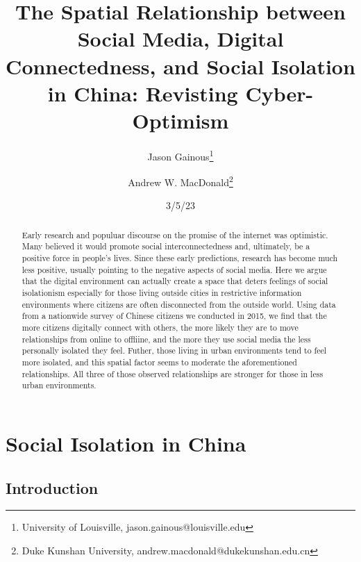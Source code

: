 \documentclass[
  letterpaper,
  DIV=11,
  numbers=noendperiod]{scrartcl}
\title{The Spatial Relationship between Social Media, Digital
Connectedness, and Social Isolation in China: Revisting Cyber-Optimism}
\author{Jason Gainous\footnote{University of Louisville,
  jason.gainous@louisville.edu} \and Andrew W. MacDonald\footnote{Duke
  Kunshan University, andrew.macdonald@dukekunshan.edu.cn}}
\date{3/5/23}
\begin{document}
\maketitle
\begin{abstract}
Early research and populuar discourse on the promise of the internet was
optimistic. Many believed it would promote social interconnectedness
and, ultimately, be a positive force in people's lives. Since these
early predictions, research has become much less positive, usually
pointing to the negative aspects of social media. Here we argue that the
digital environment can actually create a space that deters feelings of
social isolationism especially for those living outside cities in
restrictive information environments where citizens are often
disconnected from the outside world. Using data from a nationwide survey
of Chinese citizens we conducted in 2015, we find that the more citizens
digitally connect with others, the more likely they are to move
relationships from online to offliine, and the more they use social
media the less personally isolated they feel. Futher, those living in
urban environments tend to feel more isolated, and this spatial factor
seems to moderate the aforementioned relationships. All three of those
observed relationships are stronger for those in less urban
environments.
\end{abstract}
\ifdefined\Shaded\renewenvironment{Shaded}{\begin{tcolorbox}[breakable, enhanced, frame hidden, interior hidden, boxrule=0pt, sharp corners, borderline west={3pt}{0pt}{shadecolor}]}{\end{tcolorbox}}\fi

\hypertarget{social-isolation-in-china}{%
\section{Social Isolation in China}\label{social-isolation-in-china}}

\hypertarget{introduction}{%
\subsection{Introduction}\label{introduction}}
\end{document}
